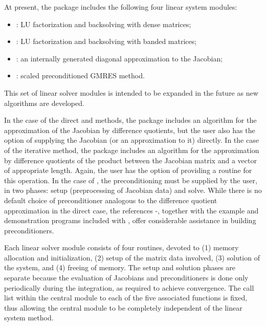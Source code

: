 At present, the package includes the following four {\cvode} linear system
modules:
\begin{itemize} 
\item {\cvdense}: LU factorization and backsolving with dense matrices; 
\item {\cvband}: LU factorization and backsolving with banded matrices; 
\item {\cvdiag}: an internally generated diagonal approximation to the 
Jacobian; 
\item {\cvspgmr}: scaled preconditioned GMRES method.
\end{itemize}
This set of linear solver modules is intended to be expanded in the
future as new algorithms are developed.

In the case of the direct {\cvdense} and {\cvband} methods, the package includes
an algorithm for the approximation of the Jacobian by difference
quotients, but the user also has the option of supplying the Jacobian
(or an approximation to it) directly. In the case of the iterative
{\cvspgmr} method, the package includes an algorithm for the approximation
by difference quotients of the product between the Jacobian matrix and
a vector of appropriate length. Again, the user has the option of providing
a routine for this operation.
In  the case of {\cvspgmr}, 
the preconditioning must be supplied by the user, in two phases: 
setup (preprocessing of Jacobian data) and solve.
While there is no default
choice of preconditioner analogous to the difference quotient
approximation in the direct case, the references
\cite{BrHi:89}-\cite{Byr:92}, together with
the example and demonstration programs included with {\cvode}, offer
considerable assistance in building preconditioners.

Each {\cvode} linear solver module consists of four routines, devoted to (1)
memory allocation and initialization, (2) setup of the matrix data
involved, (3) solution of the system, and (4) freeing of memory.  
The setup and solution phases are separate because the evaluation of
Jacobians and preconditioners is done only periodically during the
integration, as required to achieve convergence. The call list within
the central {\cvode} module to each of the five associated functions is
fixed, thus allowing the central module to be completely independent
of the linear system method.

